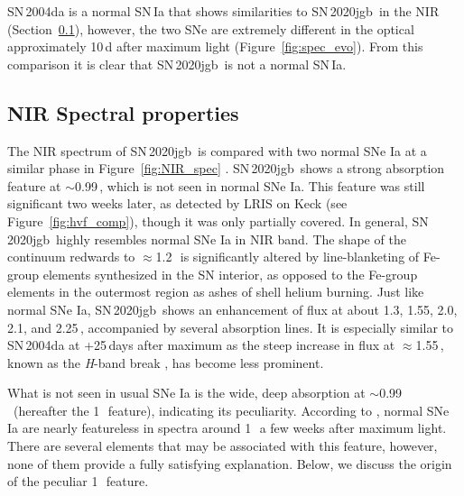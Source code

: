 \documentclass[twocolumn]{aastex631}
\newcommand{\sn}{SN\,2020jgb}
\begin{document}
SN\,2004da is a normal SN\,Ia that shows similarities to \sn\ in the NIR (Section~\ref{sec:NIR_spec}), however, the two SNe are extremely different in the optical approximately 10\,d after maximum light (Figure~\ref{fig:spec_evo}). From this comparison it is clear that \sn\ is not a normal SN\,Ia. 

\subsection{NIR Spectral properties}
\label{sec:NIR_spec}
The NIR spectrum of \sn\ is compared with two normal SNe Ia at a similar phase in Figure~\ref{fig:NIR_spec} \citep[data for SNe\,2004ab and 2004da from][]{Marion2009_NIR}. \sn\ shows a strong absorption feature at $\sim$0.99\,\micron, which is not seen in normal SNe Ia. This feature was still significant two weeks later, as detected by LRIS on Keck (see Figure~\ref{fig:hvf_comp}), though it was only partially covered. In general, \sn\ highly resembles normal SNe Ia in NIR band. The shape of the continuum redwards to $\approx$1.2\,\micron\ is significantly altered by line-blanketing of Fe-group elements synthesized in the SN interior, as opposed to the Fe-group elements in the outermost region as ashes of shell helium burning. Just like normal SNe Ia, \sn\ shows an enhancement of flux at about 1.3, 1.55, 2.0, 2.1, and 2.25\,\micron, accompanied by several  absorption lines. It is especially similar to SN\,2004da at +25\,days after maximum as the steep increase in flux at $\approx$1.55\,\micron, known as the \textit H-band break \citep{Hsiao_CSP_2019}, has become less prominent.%

What is not seen in usual SNe Ia is the wide, deep absorption at $\sim$0.99\,\micron\ (hereafter the 1\,\micron\ feature), indicating its peculiarity. According to \citet{Marion2009_NIR}, normal SNe Ia are nearly featureless in spectra around 1\,\micron\ a few weeks after maximum light. There are several elements that may be associated with this feature, however, none of them provide a fully satisfying explanation. Below, we discuss the origin of the peculiar 1\,\micron\ feature.
\end{document}

